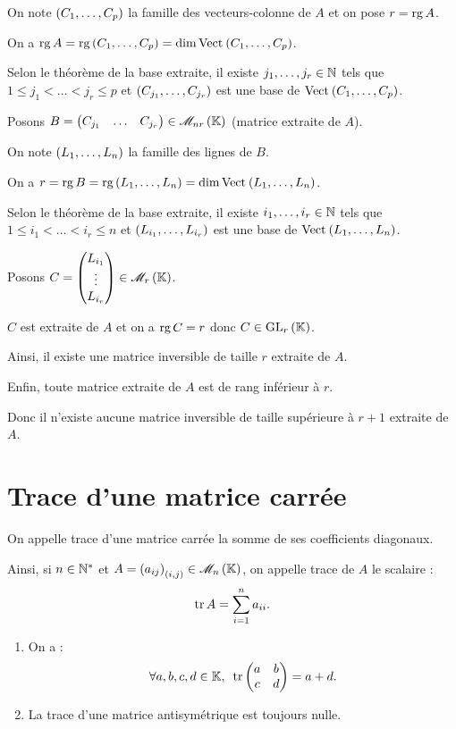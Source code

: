 \begin{dem}
On note \(\left(C_1,\dots,C_p\right)\) la famille des vecteurs-colonne de \(A\) et on pose \(r=\operatorname{rg} A\).

On a \(\rg A=\rg\paren{C_1,\dots,C_p}=\dim\Vect{C_1,\dots,C_p}\).

Selon le théorème de la base extraite, il existe \(j_1,\dots,j_r\in\mathbb{N}\) tels que \(1\leq j_1<\dots<j_r\leq p\) et \(\left(C_{j_1},\dots,C_{j_r}\right)\) est une base de \(\Vect{C_1,\dots,C_p}\).

Posons \(B=\begin{pmatrix}
C_{j_1} & \dots & C_{j_r}
\end{pmatrix}\in\M{nr}\) (matrice extraite de \(A\)).

On note \(\left(L_1,\dots,L_n\right)\) la famille des lignes de \(B\).

On a \(r=\rg B=\rg\paren{L_1,\dots,L_n}=\dim\Vect{L_1,\dots,L_n}\).

Selon le théorème de la base extraite, il existe \(i_1,\dots,i_r\in\mathbb{N}\) tels que \(1\leq i_1<\dots<i_r\leq n\) et \(\left(L_{i_1},\dots,L_{i_r}\right)\) est une base de \(\Vect{L_1,\dots,L_n}\).

Posons \(C=\tcoords{L_{i_1}}{\vdots}{L_{i_r}}\in\M{r}\).

\(C\) est extraite de \(A\) et on a \(\operatorname{rg} C=r\) donc \(C\in\GL{r}\).

Ainsi, il existe une matrice inversible de taille \(r\) extraite de \(A\).

Enfin, toute matrice extraite de \(A\) est de rang inférieur à \(r\).

Donc il n'existe aucune matrice inversible de taille supérieure à \(r+1\) extraite de \(A\).
\end{dem}

\section{Trace d'une matrice carrée}

\begin{defi}
On appelle trace d'une matrice carrée la somme de ses coefficients diagonaux.

Ainsi, si \(n\in\mathbb{N}^*\) et \(A=\paren{a_{ij}}_{\paren{i,j}}\in\M{n}\), on appelle trace de \(A\) le scalaire : \[\operatorname{tr} A=\sum_{i=1}^na_{ii}.\]
\end{defi}

\begin{ex}
\begin{enumerate}
\item On a : \[\quantifs{\forall a,b,c,d\in\K}\tr\begin{pmatrix}
a & b \\
c & d
\end{pmatrix}=a+d.\]

\item La trace d'une matrice antisymétrique est toujours nulle.
\end{enumerate}
\end{ex}

